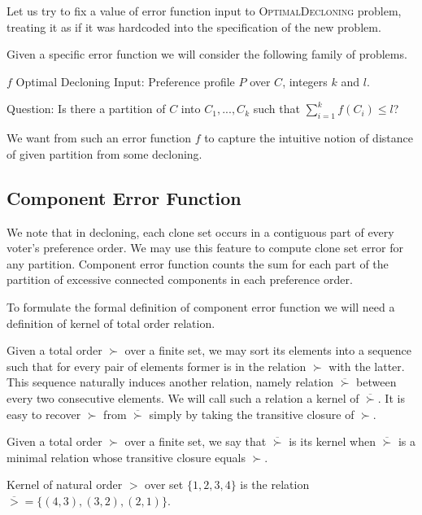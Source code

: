 Let us try to fix a value of error function input to \textsc{OptimalDecloning} problem,
treating it as if it was hardcoded into the specification of the new problem.

Given a specific error function we will consider the following family of problems.

\begin{problem}{ $f$ Optimal Decloning}
	Input: Preference profile $P$ over $C$, integers $k$ and $l$.

	Question: Is there a partition of $C$ into $C_1, ..., C_k$ such that $\sum_{i=1}^k f(C_i) \leq l$?
\end{problem}

We want from such an error function $f$ to capture the intuitive notion
of distance of given partition from some decloning.

\subsection{Component Error Function}

We note that in decloning, each clone set occurs in a contiguous part of every voter's preference order.
We may use this feature to compute clone set error for any partition.
Component error function counts the sum for each part of the partition of excessive connected components in each preference order.

To formulate the formal definition of component error function we will need a definition of kernel of total order relation.

Given a total order $\succ$ over a finite set, we may sort its elements into a sequence
such that for every pair of elements former is in the relation $\succ$ with the latter.
This sequence naturally induces another relation, namely relation $\overline{\succ}$
between every two consecutive elements.
We will call such a relation a kernel of $\overline{\succ}$.
It is easy to recover $\succ$ from $\overline{\succ}$ simply by taking the transitive closure of $\succ$.

\begin{defn}
Given a total order $\succ$ over a finite set, we say that $\overline{\succ}$ is its kernel when
$\overline{\succ}$ is a minimal relation whose transitive closure equals $\succ$.
\end{defn}

\begin{exmp}
Kernel of natural order $>$ over set $\{1,2,3,4\}$ is the relation
$\overline{>} = \{(4,3), (3,2), (2,1)\}$.
\end{exmp}

